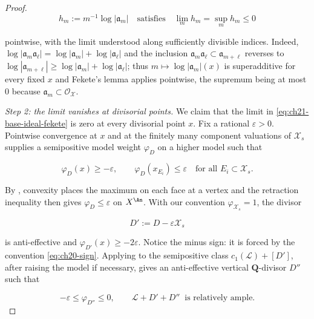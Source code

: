 \begin{proof}
\begin{equation}
\label{eq:ch21-base-ideal-fekete}
 h_m:=m^{-1}\log|\mathfrak a_m|
 \quad\text{satisfies}\quad
 \lim_m h_m=\sup_m h_m\leq0
\end{equation}

pointwise, with the limit understood along sufficiently divisible indices.
Indeed, $\log|\mathfrak a_m\mathfrak a_\ell|=
\log|\mathfrak a_m|+\log|\mathfrak a_\ell|$ and the inclusion
$\mathfrak a_m\mathfrak a_\ell\subset\mathfrak a_{m+\ell}$ reverses to
$\log|\mathfrak a_{m+\ell}|\geq
\log|\mathfrak a_m|+\log|\mathfrak a_\ell|$; thus
$m\mapsto\log|\mathfrak a_m|(x)$ is superadditive for every fixed $x$
and Fekete's lemma applies pointwise, the supremum being at most $0$
because $\mathfrak a_m\subset\mathcal O_{\mathcal X}$.

\emph{Step 2: the limit vanishes at divisorial points.}
We claim that the limit in \eqref{eq:ch21-base-ideal-fekete} is zero at
every divisorial point $x$.  Fix a
rational $\varepsilon>0$.  Pointwise convergence at $x$ and at the
finitely many component valuations of $\mathcal X_s$ supplies a
semipositive model weight $\varphi_D$ on a higher model such that

\begin{equation}
\label{eq:ch21-closedness-finite-values}
       \varphi_D(x)\geq-\varepsilon,
       \qquad
       \varphi_D(x_{E_i})\leq\varepsilon
       \quad\text{for all }E_i\subset\mathcal X_s.
\end{equation}

By , convexity places the maximum
on each face at a vertex and the retraction inequality then gives
$\varphi_D\leq\varepsilon$ on $X^{\An}$.  With our convention
$\varphi_{\mathcal X_s}=1$, the divisor

\[
                         D':=D-\varepsilon\mathcal X_s
\]

is anti-effective and
$\varphi_{D'}(x)\geq-2\varepsilon$.  Notice the minus sign: it is forced by
the convention \eqref{eq:ch20-sign}.  Applying
 to the semipositive class
$c_1(\mathcal L)+[D']$, after raising the model if necessary, gives an
anti-effective vertical $\mathbf Q$-divisor $D''$ such that

\begin{equation}
\label{eq:ch21-closedness-ample-perturbation}
        -\varepsilon\leq\varphi_{D''}\leq0,
        \qquad
        \mathcal L+D'+D''\
        \text{ is relatively ample}.
\end{equation}


\end{proof}
